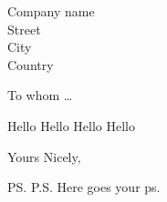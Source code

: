 \documentclass[11pt]{letter}
\begin{document}
\begin{letter}{Company name \\ Street\\ City\\ Country}
\opening{To whom \dots}

\vspace{0.75cm}

Hello Hello Hello Hello

\vspace{0.75cm}

\closing{Yours Nicely,}


\ps{P.S. Here goes your ps.}
\end{letter}
\end{document}
